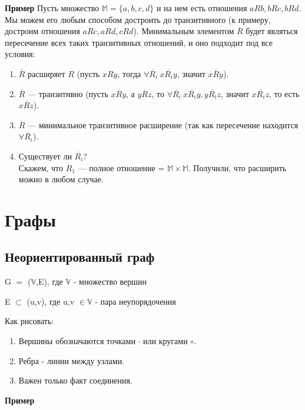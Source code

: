 \documentclass{article}
\begin{document}
		\textbf{Пример}
			Пусть множество $\mathbb{M} = \{a,b,c,d\}$ и на нем есть отношения $aRb, bRc, bRd$. Мы можем его любым способом достроить до транзитивного (к примеру, достроим отношения $aRc,aRd,cRd$). Минимальным элементом $\overline R$ будет являться пересечение всех таких транзитивных отношений, и оно подходит под все условия:
			\begin{enumerate}
				\item $\overline R$ расширяет $R$ (пусть $xRy$, тогда $\forall \overline{R_i}~x \overline{R_i} y$, значит $x \overline R y$).
				\item $\overline R$ --- транзитивно (пусть $x \overline R y$, а $y \overline R z$, то $\forall \overline{R_i}~x \overline{R_i} y, y \overline{R_i} z$, значит $x \overline{R_i} z$, то есть $x \overline R z$).
				\item $\overline R$ --- минимальное транзитивное расширение (так как пересечение находится $\forall \overline{R_i}$).
				\item Существует ли $\overline{R_i}$?\\
				Скажем, что $R_1$ --- полное отношение = $\mathbb{M} \times \mathbb{M}$. Получили, что расширить можно в любом случае.
			\end{enumerate}
	
		\section{Графы}
	\subsection{Неориентированный граф}
            G $=$ ($\mathbb{V}$,E), \quad где $\mathbb{V}$ - множество вершин
            
            E $\subset$ (u,v), \quad где u,v $\in \mathbb{V}$ - пара неупорядочения
            
		Как рисовать:
		\begin{enumerate}
			\item Вершины обозначаются точками $\cdot$ или кругами $\circ$.
			\item Ребра - линии между узлами.
			\item Важен только факт соединения.
		\end{enumerate}
	\textbf{Пример}
	
\end{document}
